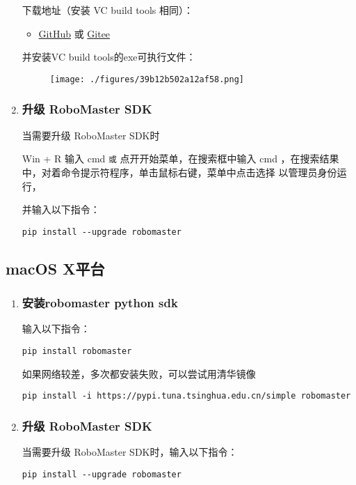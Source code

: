 \begin{enumerate}
下载地址（安装 VC build tools 相同）：\begin{itemize}
\item \href{https://github.com/dji-sdk/robomaster-sdk}{GitHub} 或 \href{https://gitee.com/xitinglin/RoboMaster-SDK}{Gitee}
\end{itemize}

并安装VC build tools的exe可执行文件：

\begin{figure}[ht]
\centering
\texttt{[image: ./figures/39b12b502a12af58.png]}
\caption{} \label{fig_PyRM1_3}
\end{figure}

\item \subsubsection{升级 RoboMaster SDK}
当需要升级 RoboMaster SDK时

Win + R 输入 cmd 
\verb|或|
点开开始菜单，在搜索框中输入 cmd ，在搜索结果中，对着命令提示符程序，单击鼠标右键，菜单中点击选择 以管理员身份运行， 

并输入以下指令：

\begin{lstlisting}[language=pythonC]
pip install --upgrade robomaster
\end{lstlisting}

\end{enumerate}

\subsection{macOS X平台}\label{sub_PyRM1_2}
\begin{enumerate}
\item \subsubsection{安装robomaster python sdk}

输入以下指令：

\begin{lstlisting}[language=pythonC]
pip install robomaster
\end{lstlisting}

如果网络较差，多次都安装失败，可以尝试用清华镜像

\begin{lstlisting}[language=pythonC]
pip install -i https://pypi.tuna.tsinghua.edu.cn/simple robomaster
\end{lstlisting}

\item \subsubsection{升级 RoboMaster SDK}
当需要升级 RoboMaster SDK时，输入以下指令：

\begin{lstlisting}[language=pythonC]
pip install --upgrade robomaster
\end{lstlisting}

\end{enumerate}

